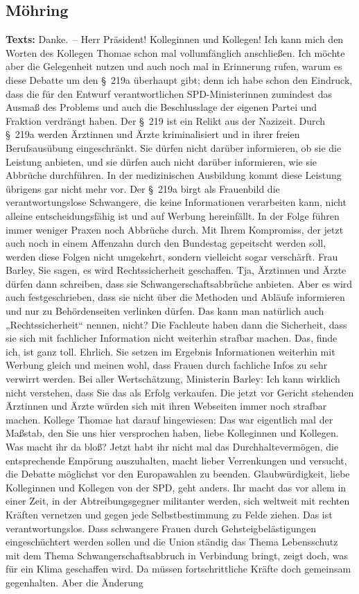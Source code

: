 \documentclass{article}
\begin{document}
\subsection{Möhring}
\noindent\textbf{Texts:} Danke. – Herr Präsident! Kolleginnen und Kollegen! Ich kann mich den Worten des Kollegen Thomae schon mal vollumfänglich anschließen. Ich möchte aber die Gelegenheit nutzen und auch noch mal in Erinnerung rufen, warum es diese Debatte um den § 219a überhaupt gibt; denn ich habe schon den Eindruck, dass die für den Entwurf verantwortlichen SPD-Ministerinnen zumindest das Ausmaß des Problems und auch die Beschlusslage der eigenen Partei und Fraktion verdrängt haben.  Der § 219 ist ein Relikt aus der Nazizeit.  Durch § 219a werden Ärztinnen und Ärzte kriminalisiert und in ihrer freien Berufsausübung eingeschränkt. Sie dürfen nicht darüber informieren, ob sie die Leistung anbieten, und sie dürfen auch nicht darüber informieren, wie sie Abbrüche durchführen. In der medizinischen Ausbildung kommt diese Leistung übrigens gar nicht mehr vor. Der § 219a birgt als Frauenbild die verantwortungslose Schwangere, die keine Informationen verarbeiten kann, nicht alleine entscheidungsfähig ist und auf Werbung hereinfällt. In der Folge führen immer weniger Praxen noch Abbrüche durch. Mit Ihrem Kompromiss, der jetzt auch noch in einem Affenzahn durch den Bundestag gepeitscht werden soll, werden diese Folgen nicht umgekehrt, sondern vielleicht sogar verschärft. Frau Barley, Sie sagen, es wird Rechtssicherheit geschaffen. Tja, Ärztinnen und Ärzte dürfen dann schreiben, dass sie Schwangerschaftsabbrüche anbieten. Aber es wird auch festgeschrieben, dass sie nicht über die Methoden und Abläufe informieren und nur zu Behördenseiten verlinken dürfen. Das kann man natürlich auch „Rechtssicherheit“ nennen, nicht? Die Fachleute haben dann die Sicherheit, dass sie sich mit fachlicher Information nicht weiterhin strafbar machen. Das, finde ich, ist ganz toll. Ehrlich.  Sie setzen im Ergebnis Informationen weiterhin mit Werbung gleich und meinen wohl, dass Frauen durch fachliche Infos zu sehr verwirrt werden. Bei aller Wertschätzung, Ministerin Barley: Ich kann wirklich nicht verstehen, dass Sie das als Erfolg verkaufen.  Die jetzt vor Gericht stehenden Ärztinnen und Ärzte würden sich mit ihren Webseiten immer noch strafbar machen. Kollege Thomae hat darauf hingewiesen: Das war eigentlich mal der Maßstab, den Sie uns hier versprochen haben, liebe Kolleginnen und Kollegen. Was macht ihr da bloß? Jetzt habt ihr nicht mal das Durchhaltevermögen, die entsprechende Empörung auszuhalten, macht lieber Verrenkungen und versucht, die Debatte möglichst vor den Europawahlen zu beenden. Glaubwürdigkeit, liebe Kolleginnen und Kollegen von der SPD, geht anders.  Ihr macht das vor allem in einer Zeit, in der Abtreibungsgegner militanter werden, sich weltweit mit rechten Kräften vernetzen und gegen jede Selbstbestimmung zu Felde ziehen. Das ist verantwortungslos. Dass schwangere Frauen durch Gehsteigbelästigungen eingeschüchtert werden sollen und die Union ständig das Thema Lebensschutz mit dem Thema Schwangerschaftsabbruch in Verbindung bringt, zeigt doch, was für ein Klima geschaffen wird.  Da müssen fortschrittliche Kräfte doch gemeinsam gegenhalten. Aber die Änderung 
\end{document}
